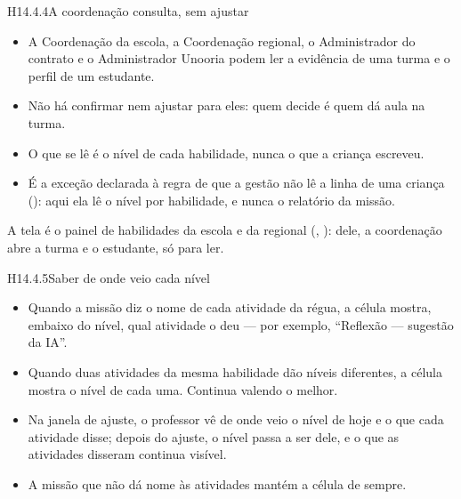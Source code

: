 \begin{historia}{H14.4.4}{A coordenação consulta, sem ajustar}{\pronto}
\aceite
\begin{itemize}
  \item A Coordenação da escola, a Coordenação regional, o Administrador do
    contrato e o Administrador Unooria podem ler a evidência de uma turma e o
    perfil de um estudante.
  \item Não há confirmar nem ajustar para eles: quem decide é quem dá aula na
    turma.
  \item O que se lê é o nível de cada habilidade, nunca o que a criança
    escreveu.
  \item É a exceção declarada à regra de que a gestão não lê a linha de uma
    criança (): aqui ela lê o nível por habilidade, e nunca o
    relatório da missão.
\end{itemize}
A tela é o painel de habilidades da escola e da regional (,
): dele, a coordenação abre a turma e o estudante, só para ler.
\end{historia}

\begin{historia}{H14.4.5}{Saber de onde veio cada nível}{\pronto}
\aceite
\begin{itemize}
  \item Quando a missão diz o nome de cada atividade da régua, a célula mostra,
    embaixo do nível, qual atividade o deu --- por exemplo, \enquote{Reflexão
    --- sugestão da IA}.
  \item Quando duas atividades da mesma habilidade dão níveis diferentes, a
    célula mostra o nível de cada uma. Continua valendo o melhor.
  \item Na janela de ajuste, o professor vê de onde veio o nível de hoje e o
    que cada atividade disse; depois do ajuste, o nível passa a ser dele, e o
    que as atividades disseram continua visível.
  \item A missão que não dá nome às atividades mantém a célula de sempre.
\end{itemize}
\end{historia}

